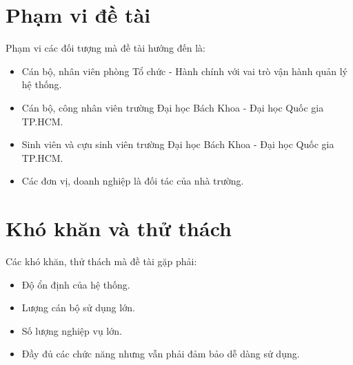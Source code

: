 \section{Phạm vi đề tài}
Phạm vi các đối tượng mà đề tài hướng đến là:
\begin{itemize}
    \item Cán bộ, nhân viên phòng Tổ chức - Hành chính với vai trò vận hành quản lý hệ thống.
    \item Cán bộ, công nhân viên trường Đại học Bách Khoa - Đại học Quốc gia TP.HCM.
    \item Sinh viên và cựu sinh viên trường Đại học Bách Khoa - Đại học Quốc gia TP.HCM.
    \item Các đơn vị, doanh nghiệp là đối tác của nhà trường.
\end{itemize}
\section{Khó khăn và thử thách}
Các khó khăn, thử thách mà đề tài gặp phải:
\begin{itemize}
    \item Độ ổn định của hệ thống.
    \item Lượng cán bộ sử dụng lớn.
    \item Số lượng nghiệp vụ lớn.
    \item Đầy đủ các chức năng nhưng vẫn phải đảm bảo dễ dàng sử dụng.
\end{itemize}